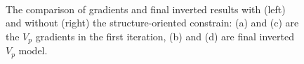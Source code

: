 \begin{figure}[!htb]
   \centering
   \\
   \caption{The comparison of gradients and final inverted results with (left) and
   without (right) 
   the structure-oriented constrain: (a) and (c) are the $V_p$ gradients in the first
   iteration, (b) and (d) are final inverted $V_p$ model.}
   \label{fig:LSF_comparison}
\end{figure}

